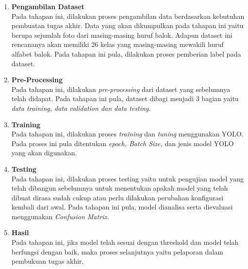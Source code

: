 \begin{enumerate}
   \item \textbf{Pengambilan Dataset} \\
   Pada tahapan ini, dilakukan proses pengambilan data berdasarkan kebutuhan pembuatan tugas akhir. Data yang akan dikumpulkan pada tahapan ini yaitu berupa sejumlah foto dari masing-masing huruf balok. Adapun dataset ini rencananya akan memiliki 26 kelas yang masing-masing mewakili huruf alfabet balok. Pada tahapan ini pula, dilakukan proses pemberian label pada dataset.
   \item \textbf{Pre-Processing} \\
   Pada tahapan ini, dilakukan \textit{pre-processing} dari dataset yang sebelumnya telah didapat. Pada tahapan ini pula, dataset dibagi menjadi 3 bagian yaitu \textit{data training, data validation dan data testing.}
   \item \textbf{Training} \\
   Pada tahapan ini, dilakukan proses \textit{training} dan \textit{tuning} menggunakan YOLO. Pada proses ini pula ditentukan \textit{epoch, Batch Size,} dan jenis model YOLO yang akan digunakan.
   \item \textbf{Testing} \\
   Pada tahapan ini, dilakukan proses testing yaitu untuk pengujian model yang telah dibangun sebelumnya untuk menentukan apakah model yang telah dibuat dirasa sudah cukup atau perlu dilakukan perubahan konfigurasi kembali dari awal. Pada tahapan ini pula, model dianalisa serta dievaluasi menggunakan \textit{Confusion Matrix.}
   \item \textbf{Hasil} \\
   Pada tahapan ini, jika model telah sesuai dengan threshold dan model telah berfungsi dengan baik, maka proses selanjutnya yaitu pelaporan dalam pembukuan tugas akhir.
\end{enumerate}